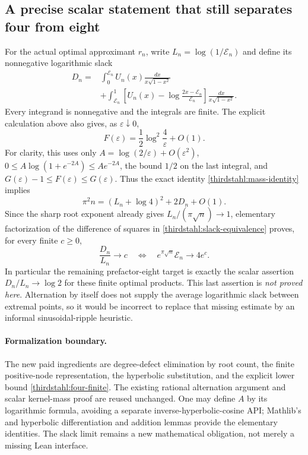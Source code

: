 \documentclass[11pt]{article}
\newcommand{\code}[1]{\ifmmode\text{\small\nolinkurl{#1}}\else{\small\nolinkurl{#1}}\fi}
\theoremstyle{remark}
\numberwithin{equation}{section}
\begin{document}
\subsection{A precise scalar statement that still separates four from eight}
For the actual optimal approximant $r_n$, write
$L_n=\log(1/\mathcal E_n)$ and define its nonnegative logarithmic slack
\begin{align}
 D_n={}&\int_0^{\mathcal E_n}U_n(x)\frac{dx}{x\sqrt{1-x^2}}
 \nonumber\\
 &+\int_{\mathcal E_n}^1
 \left[U_n(x)-\log\frac{2x-\mathcal E_n}{\mathcal E_n}\right]
 \frac{dx}{x\sqrt{1-x^2}}.
 \label{thirdstahl:slack}
\end{align}
Every integrand is nonnegative and the integrals are finite.
The explicit calculation above also gives, as $\varepsilon\downarrow0$,
\[
 F(\varepsilon)=\frac12\log^2\frac4\varepsilon+O(1).
\]
For clarity, this uses only
$A=\log(2/\varepsilon)+O(\varepsilon^2)$,
$0\le A\log(1+e^{-2A})\le A e^{-2A}$, the bound $1/2$ on the
last integral, and $G(\varepsilon)-1\le F(\varepsilon)\le G(\varepsilon)$.
Thus the exact identity \eqref{thirdstahl:mass-identity} implies
\begin{equation}\label{thirdstahl:slack-equivalence}
 \pi^2n=(L_n+\log4)^2+2D_n+O(1).
\end{equation}
Since the sharp root exponent already gives
$L_n/(\pi\sqrt n)\to1$, elementary factorization of the difference
of squares in \eqref{thirdstahl:slack-equivalence} proves, for every
finite $c\ge0$,
\[
 \frac{D_n}{L_n}\longrightarrow c
 \quad\Longleftrightarrow\quad
 e^{\pi\sqrt n}\mathcal E_n\longrightarrow4e^c.
\]
In particular the remaining prefactor-eight target is exactly the
scalar assertion $D_n/L_n\to\log2$ for these finite optimal products.
This last assertion is \emph{not proved here}.  Alternation by itself
does not supply the average logarithmic slack between extremal
points, so it would be incorrect to replace that missing estimate by
an informal sinusoidal-ripple heuristic.

\paragraph{Formalization boundary.}
The new paid ingredients are degree-defect elimination by root count,
the finite positive-node representation, the hyperbolic substitution,
and the explicit lower bound \eqref{thirdstahl:four-finite}.
The existing rational alternation argument and scalar kernel-mass
proof are reused unchanged.  One may define $A$ by its logarithmic
formula, avoiding a separate inverse-hyperbolic-cosine API; Mathlib's
\code{Real.cosh_log} and hyperbolic differentiation and addition
lemmas provide the elementary identities.  The slack limit remains
a new mathematical obligation, not merely a missing Lean interface.
\end{document}
